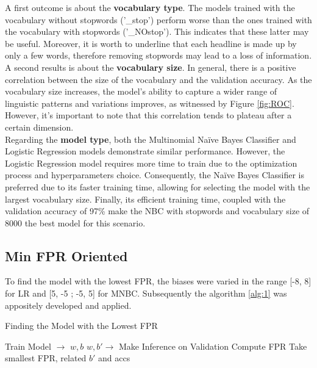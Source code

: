 \documentclass{article}
\begin{document}
\begin{multicols}{2}
A first outcome is about the \textbf{vocabulary type}. The models trained with the vocabulary without stopwords ('\_stop') perform worse than the ones trained 
with the vocabulary with stopwords ('\_NOstop'). This indicates that these latter may be useful. Moreover, it is worth to underline that each headline is made up 
by only a few words, therefore removing stopwords may lead to a loss of information.
A second results is about the \textbf{vocabulary size}. In general, there is a positive correlation between the size of the vocabulary and the 
validation accuracy. As the vocabulary size increases, the model's ability to capture a wider range of linguistic patterns and variations 
improves, as witnessed by Figure \ref{fig:ROC}. However, it's important to note that this correlation tends to plateau after a certain dimension.\\
Regarding the \textbf{model type}, both the Multinomial Naïve Bayes Classifier and Logistic Regression models demonstrate similar performance. 
However, the Logistic Regression model requires more time to train due to the optimization process and hyperparameters choice\footnotemark. Consequently, the Naïve Bayes Classifier 
is preferred due to its faster training time, allowing for selecting the model with the largest vocabulary size.
Finally, its efficient training time, coupled with the validation accuracy of 97\% make the NBC with stopwords and vocabulary size 
of 8000 the best model for this scenario.


\subsection{Min FPR Oriented}
To find the model with the lowest FPR, the biases were varied in the range [-8, 8] for LR and [5, -5 ; -5, 5] for MNBC.
Subsequently the algorithm \ref{alg:1} was appositely developed and applied.


\begin{algorithm}[H]
    \small
    \caption{Finding the Model with the Lowest FPR}
    \begin{algorithmic}[1]
    \STATE Train Model $\rightarrow$ $w, b$
    \STATE $w, b' \rightarrow$ Make Inference on Validation
    \STATE Compute FPR
    \ENDFOR
    \STATE Take smallest FPR, related $b'$ and accs
    \ENDFOR
    \ENDFOR
    \ENDFOR
    \end{algorithmic}
    \label{alg:1}
    \end{algorithm}
  


\end{multicols}
\end{document}
